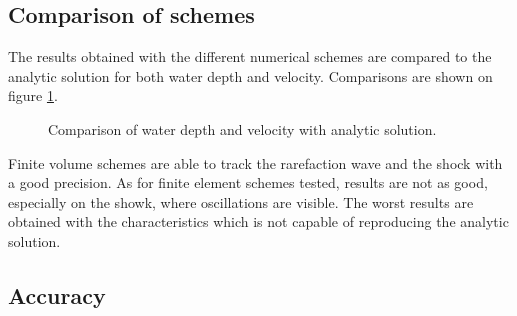 \subsection{Comparison of schemes}

The results obtained with the different numerical schemes are compared to the analytic solution for both
water depth and velocity. Comparisons are shown on figure \ref{fig:stoker:comparison}.

\begin{figure}[H]
\begin{minipage}[t]{0.5\textwidth}
 \centering
\end{minipage}%
\begin{minipage}[t]{0.5\textwidth}
 \centering
\end{minipage}
\begin{minipage}[t]{0.5\textwidth}
 \centering
\end{minipage}%
\begin{minipage}[t]{0.5\textwidth}
 \centering
\end{minipage}
\begin{minipage}[t]{0.5\textwidth}
 \centering
\end{minipage}%
\begin{minipage}[t]{0.5\textwidth}
 \centering
\end{minipage}
  \caption{Comparison of water depth and velocity with analytic solution.}
  \label{fig:stoker:comparison}
\end{figure}

Finite volume schemes are able to track the rarefaction wave and the shock with a good precision.
As for finite element schemes tested, results are not as good, especially on the showk,
where oscillations are visible.
The worst results are obtained with the characteristics which is not capable of reproducing the analytic solution.

\subsection{Accuracy}


